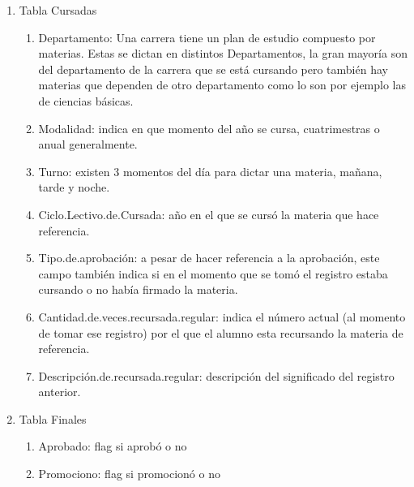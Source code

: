 \begin{enumerate}
	\item Tabla Cursadas
	\begin{enumerate}
		\item Departamento: Una carrera tiene un plan de estudio compuesto por materias. Estas se dictan en distintos Departamentos, la gran mayoría son del departamento de la carrera que se está cursando pero también hay materias que dependen de otro departamento como lo son por ejemplo las de ciencias básicas.
		\item Modalidad: indica en que momento del año se cursa, cuatrimestras o anual generalmente.
		\item Turno: existen 3 momentos del día para dictar una materia, mañana, tarde y noche.
		\item Ciclo.Lectivo.de.Cursada: año en el que se cursó la materia que hace referencia.
		\item Tipo.de.aprobación: a pesar de hacer referencia a la aprobación, este campo también indica si en el momento que se tomó el registro estaba cursando o no había firmado la materia.
		\item Cantidad.de.veces.recursada.regular: indica el número actual (al momento de tomar ese registro) por el que el alumno esta recursando la materia de referencia.
		\item Descripción.de.recursada.regular: descripción del significado del registro anterior.
	\end{enumerate}
	\item Tabla Finales
	\begin{enumerate}
		\item Aprobado: flag si aprobó o no
		\item Promociono: flag si promocionó o no
	\end{enumerate}
\end{enumerate}




